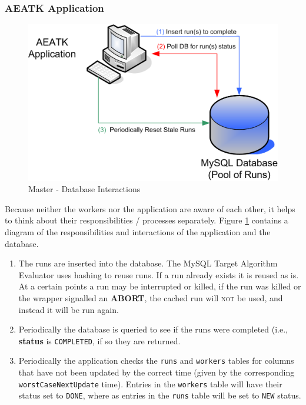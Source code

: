 \documentclass[11pt,letterpaper,oneside]{article}
\begin{document}
\subsubsection{AEATK Application}

\begin{figure}
\centering
\includegraphics[scale=1]{img/Architecture/Master}
\caption{Master - Database Interactions}\label{master}
\end{figure}

Because neither the workers nor the application are aware of each other, it helps to think about their responsibilities / processes separately. Figure \ref{master} contains a diagram of the responsibilities and interactions of the application and the database.

\begin{enumerate}
\item The runs are inserted into the database. The MySQL Target Algorithm Evaluator uses hashing to reuse runs. If a run already exists it is reused as is. At a certain points a run may be interrupted or killed, if the run was killed or the wrapper signalled an \textbf{ABORT}, the cached run will \textsc{not} be used, and instead it will be run again.

\item Periodically the database is queried to see if the runs were completed (i.e., \textbf{status} is \texttt{COMPLETED}, if so they are returned.

\item Periodically the application checks the \texttt{runs} and \texttt{workers} tables for columns that have not been updated by the correct time (given by the corresponding \texttt{worstCaseNextUpdate} time). Entries in the \texttt{workers} table will have their status set to \texttt{DONE}, where as entries in the \texttt{runs} table will be set to \texttt{NEW} status.

\end{enumerate}
\end{document}

